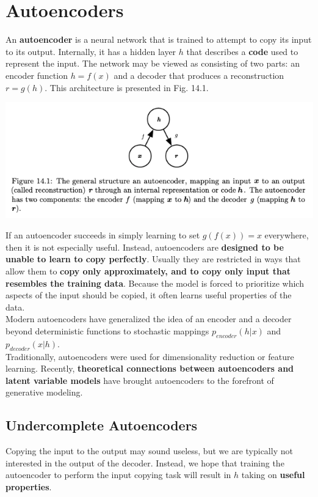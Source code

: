 \documentclass[11pt]{article}
\author{Mike Chyson}
\date{\today}
\title{}
\begin{document}
\tableofcontents

\section{Autoencoders}
\label{sec:orgf2e8d7e}
An \textbf{autoencoder} is a neural network that is trained to attempt to copy its input to its output. Internally, it has a hidden layer \(h\) that describes a \textbf{code} used to represent the input. The network may be viewed as consisting of two parts: an encoder function \(h=f(x)\) and a decoder that produces a reconstruction \(r=g(h)\). This architecture is presented in Fig. 14.1.\\

\begin{center}
\includegraphics[width=.9\linewidth]{pics/figure14.1-autoencoder.png}
\end{center}

If an autoencoder succeeds in simply learning to set \(g(f(x)) = x\) everywhere, then it is not especially useful. Instead, autoencoders are \textbf{designed to be unable to learn to copy perfectly}. Usually they are restricted in ways that allow them to \textbf{copy only approximately, and to copy only input that resembles the training data}. Because the model is forced to prioritize which aspects of the input should be copied, it often learns useful properties of the data.\\


Modern autoencoders have generalized the idea of an encoder and a decoder beyond deterministic functions to stochastic mappings \(p_{encoder}(h | x)\) and \(p_{decoder}(x | h)\).\\

Traditionally, autoencoders were used for dimensionality reduction or feature learning. Recently, \textbf{theoretical connections between autoencoders and latent variable models} have brought autoencoders to the forefront of generative modeling.\\

\subsection{Undercomplete Autoencoders}
\label{sec:org4d69cc3}
Copying the input to the output may sound useless, but we are typically not interested in the output of the decoder. Instead, we hope that training the autoencoder to perform the input copying task will result in \(h\) taking on \textbf{useful properties}.\\
\end{document}
